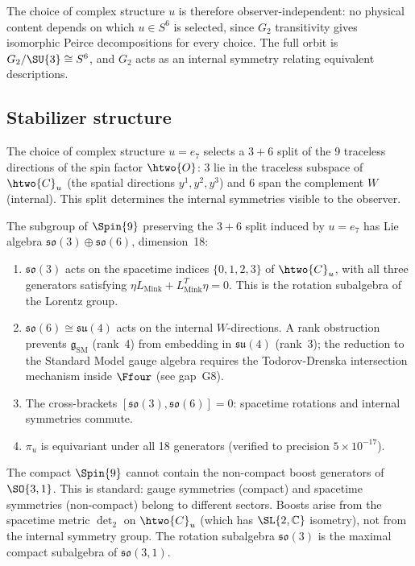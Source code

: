 The choice of complex structure $u$ is therefore observer-independent:
no physical content depends on which $u \in S^6$ is selected, since
$G_2$ transitivity gives isomorphic Peirce decompositions for every
choice. The full orbit is $G_2/\SU{3} \cong S^6$, and $G_2$ acts as an
internal symmetry relating equivalent descriptions.

\subsection{Stabilizer structure}
\label{sec:stabilizer}

The choice of complex structure $u = e_7$ selects a $3 + 6$ split of
the 9 traceless directions of the spin factor $\htwo{O}$: 3 lie in the
traceless subspace of $\htwo{C}_u$ (the spatial directions $y^1, y^2,
y^3$) and 6 span the complement $W$ (internal).
This split determines the internal symmetries visible to the observer.

\begin{proposition}
\label{prop:stabilizer}
The subgroup of $\Spin{9}$ preserving the $3 + 6$ split induced by
$u = e_7$ has Lie algebra $\mathfrak{so}(3) \oplus \mathfrak{so}(6)$,
dimension~18:
\begin{enumerate}[label=(\alph*)]
\item $\mathfrak{so}(3)$ acts on the spacetime indices
  $\{0, 1, 2, 3\}$ of $\htwo{C}_u$, with all three generators
  satisfying
  $\eta L_{\mathrm{Mink}} + L_{\mathrm{Mink}}^T \eta = 0$.
  This is the rotation subalgebra of the Lorentz group.

\item $\mathfrak{so}(6) \cong \mathfrak{su}(4)$ acts on the internal
  $W$-directions. A rank obstruction prevents
  $\mathfrak{g}_{\mathrm{SM}}$ (rank~4) from embedding in
  $\mathfrak{su}(4)$ (rank~3); the reduction to the Standard Model
  gauge algebra requires the Todorov-Drenska intersection mechanism
  inside $\Ffour$ (see gap~G8).

\item The cross-brackets $[\mathfrak{so}(3), \mathfrak{so}(6)] = 0$:
  spacetime rotations and internal symmetries commute.

\item $\pi_u$ is equivariant under all 18 generators
  (verified to precision $5 \times 10^{-17}$).
\end{enumerate}
\end{proposition}

The compact $\Spin{9}$ cannot contain the non-compact boost generators
of $\SO{3,1}$. This is standard: gauge symmetries (compact) and
spacetime symmetries (non-compact) belong to different sectors. Boosts
arise from the spacetime metric $\det_2$ on $\htwo{C}_u$ (which has
$\SL{2,\mathbb{C}}$ isometry), not from the internal symmetry group.
The rotation subalgebra $\mathfrak{so}(3)$ is the maximal compact
subalgebra of $\mathfrak{so}(3,1)$.
